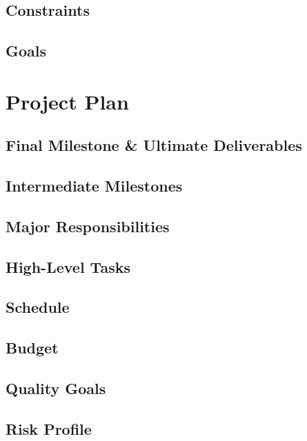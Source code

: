 \documentclass[10pt,letterpaper]{article}
\begin{document}
\subsection{Constraints}


\subsection{Goals}


\section{Project Plan}


\subsection{Final Milestone \& Ultimate Deliverables}


\subsection{Intermediate Milestones}


\subsection{Major Responsibilities}


\subsection{High-Level Tasks}


\subsection{Schedule}


\subsection{Budget}


\subsection{Quality Goals}


\subsection{Risk Profile}

\end{document}
